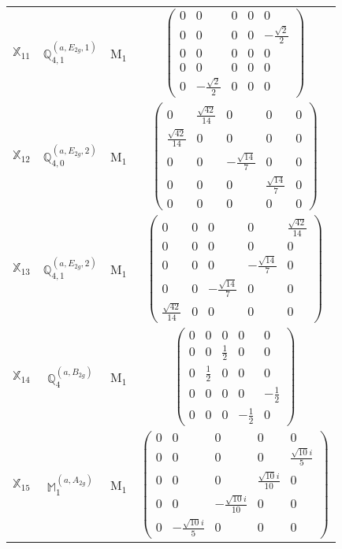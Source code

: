 \documentclass[fleqn,10pt,landscape]{article}
\begin{document}
\begin{itemize}
\begin{center}
\begin{longtable}{c|c|c|c}
$ \mathbb{X}_{11} $ & $\mathbb{Q}_{4,1}^{(a,E_{2g},1)}$ & M$_{1}$ & $\begin{pmatrix} 0 & 0 & 0 & 0 & 0 \\ 0 & 0 & 0 & 0 & - \frac{\sqrt{2}}{2} \\ 0 & 0 & 0 & 0 & 0 \\ 0 & 0 & 0 & 0 & 0 \\ 0 & - \frac{\sqrt{2}}{2} & 0 & 0 & 0 \end{pmatrix}$ \\
$ \mathbb{X}_{12} $ & $\mathbb{Q}_{4,0}^{(a,E_{2g},2)}$ & M$_{1}$ & $\begin{pmatrix} 0 & \frac{\sqrt{42}}{14} & 0 & 0 & 0 \\ \frac{\sqrt{42}}{14} & 0 & 0 & 0 & 0 \\ 0 & 0 & - \frac{\sqrt{14}}{7} & 0 & 0 \\ 0 & 0 & 0 & \frac{\sqrt{14}}{7} & 0 \\ 0 & 0 & 0 & 0 & 0 \end{pmatrix}$ \\
$ \mathbb{X}_{13} $ & $\mathbb{Q}_{4,1}^{(a,E_{2g},2)}$ & M$_{1}$ & $\begin{pmatrix} 0 & 0 & 0 & 0 & \frac{\sqrt{42}}{14} \\ 0 & 0 & 0 & 0 & 0 \\ 0 & 0 & 0 & - \frac{\sqrt{14}}{7} & 0 \\ 0 & 0 & - \frac{\sqrt{14}}{7} & 0 & 0 \\ \frac{\sqrt{42}}{14} & 0 & 0 & 0 & 0 \end{pmatrix}$ \\
$ \mathbb{X}_{14} $ & $\mathbb{Q}_{4}^{(a,B_{2g})}$ & M$_{1}$ & $\begin{pmatrix} 0 & 0 & 0 & 0 & 0 \\ 0 & 0 & \frac{1}{2} & 0 & 0 \\ 0 & \frac{1}{2} & 0 & 0 & 0 \\ 0 & 0 & 0 & 0 & - \frac{1}{2} \\ 0 & 0 & 0 & - \frac{1}{2} & 0 \end{pmatrix}$ \\
$ \mathbb{X}_{15} $ & $\mathbb{M}_{1}^{(a,A_{2g})}$ & M$_{1}$ & $\begin{pmatrix} 0 & 0 & 0 & 0 & 0 \\ 0 & 0 & 0 & 0 & \frac{\sqrt{10} i}{5} \\ 0 & 0 & 0 & \frac{\sqrt{10} i}{10} & 0 \\ 0 & 0 & - \frac{\sqrt{10} i}{10} & 0 & 0 \\ 0 & - \frac{\sqrt{10} i}{5} & 0 & 0 & 0 \end{pmatrix}$ \\

\end{longtable}
\end{center}
\end{itemize}
\end{document}
